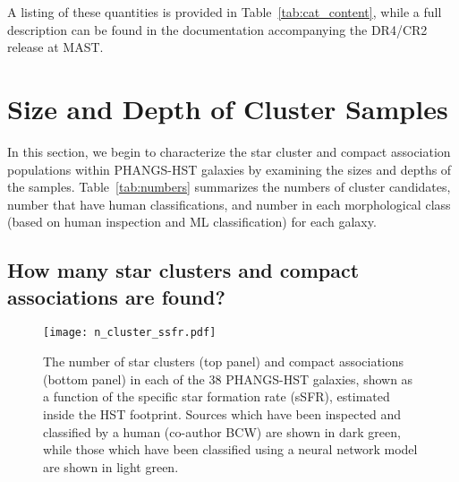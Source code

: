 \documentclass[linenumbers]{aastex63}
\begin{document}
A listing of these quantities is provided in Table~\ref{tab:cat_content}, while a full description can be found in the documentation accompanying the DR4/CR2 release at MAST.
%

%



\section{Size and Depth of Cluster Samples}\label{sect:catalog_properties}

%

%
In this section, we begin to characterize the star cluster and compact association populations within PHANGS-HST galaxies by examining the sizes and depths of the samples.  Table~\ref{tab:numbers} summarizes the numbers of cluster candidates, number that have human classifications, and number in each morphological class (based on human inspection and ML classification) for each galaxy.

\subsection{How many star clusters and compact associations are found?}
%
\begin{figure}
\texttt{[image: n\_cluster\_ssfr.pdf]}
 \caption{The number of star clusters (top panel) and compact associations (bottom panel) in each of the 38 PHANGS-HST galaxies, shown as a function of the specific star formation rate (sSFR), estimated inside the HST footprint. Sources which have been inspected and classified by a human (co-author BCW) are shown in dark green, while those which have been classified using a neural network model \citep{hannon_star_2023} are shown in light green.}
 \label{fig:n_cluster_ssfr}
\end{figure}
% 
\end{document}
